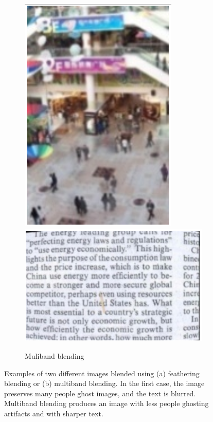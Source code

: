 \begin{figure}[h]
\begin{subfigure}[b]{0.495\textwidth}
\includegraphics[scale=0.22]{images/multiband1}
\includegraphics[scale=0.24]{images/multiband2}
\caption{Muliband blending}
\label{fig:multiband}
\end{subfigure}
\caption{Examples of two different images blended using (a) feathering blending or (b) multiband blending. In the first case, the image preserves many people ghost images, and the text is blurred. Multiband blending produces an image with less people ghosting artifacts and with sharper text.}
\end{figure}






